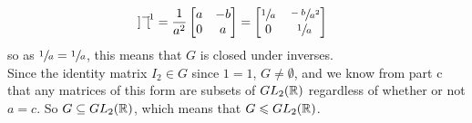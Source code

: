 \documentclass[12pt]{article}
\begin{document}
\begin{enumerate}[label=\textbf{\alph*.}]
\[\begin{bmatrix}
            \end{bmatrix}^{-1}
            = \dfrac{1}{a^2}\begin{bmatrix}
            a & -b \\
            0 & a \\
            \end{bmatrix}
            = \begin{bmatrix}
            \sfrac{1}{a} & \sfrac{-b}{a^2} \\
            0 & \sfrac{1}{a} \\
            \end{bmatrix} \]
            so as $\sfrac{1}{a} = \sfrac{1}{a}$,
            this means that $G$ is closed under inverses. \\
            Since the identity matrix $I_2 \in G$ since $1 = 1$,
            $G \neq \emptyset$,
            and we know from part c that any matrices of this form are
            subsets of $GL_2(\mathbb{R})$ regardless of whether or not $a = c$.
            So $G \subseteq GL_2(\mathbb{R})$,
            which means that $G \leqslant GL_2(\mathbb{R})$.
    \end{enumerate}  
    
    
\end{document}
